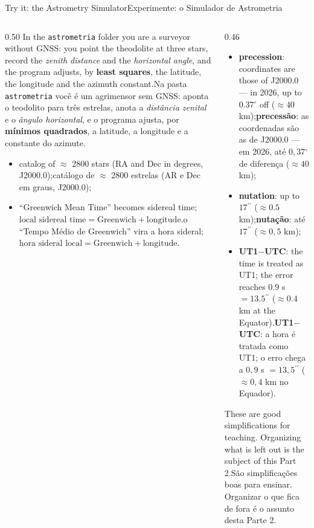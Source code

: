 \documentclass[aspectratio=169,11pt]{beamer}
\newcommand{\tr}[2]{\ifEN#2\else#1\fi}
\newcommand{\bnum}[1]{\textbf{\textcolor{mTeal}{#1}}}
\newcommand{\asec}{\ensuremath{{}^{\prime\prime}}}
\newcommand{\gr}{\ensuremath{{}^{\circ}}}
\begin{document}
\begin{frame}{\tr{Experimente: o Simulador de Astrometria}{Try it: the Astrometry Simulator}}
  \begin{columns}[T]
    \begin{column}{0.50\textwidth}
      \small
      \tr{Na pasta \texttt{astrometria} você é um agrimensor sem GNSS: aponta o teodolito para
      três estrelas, anota a \emph{distância zenital} e o \emph{ângulo horizontal}, e o
      programa ajusta, por \bnum{mínimos quadrados}, a latitude, a longitude e a constante do
      azimute.}{In the \texttt{astrometria} folder you are a surveyor without GNSS: you point
      the theodolite at three stars, record the \emph{zenith distance} and the
      \emph{horizontal angle}, and the program adjusts, by \bnum{least squares}, the latitude,
      the longitude and the azimuth constant.}
      \medskip
      \begin{itemize}
        \setlength{\itemsep}{2pt}
        \item \tr{catálogo de $\approx$ \num{2800} estrelas (AR e Dec em graus, J2000.0);}{catalog of $\approx$ \num{2800} stars (RA and Dec in degrees, J2000.0);}
        \item \tr{o ``Tempo Médio de Greenwich'' vira a hora sideral; $\text{hora sideral local} = \text{Greenwich} + \text{longitude}$.}{``Greenwich Mean Time'' becomes sidereal time; $\text{local sidereal time} = \text{Greenwich} + \text{longitude}$.}
      \end{itemize}
    \end{column}
    \begin{column}{0.46\textwidth}
      \begin{cuidado}[title={\tr{O que o simulador deixa de fora}{What the simulator leaves out}}]
        \footnotesize
        \begin{itemize}
          \setlength{\itemsep}{2pt}
          \item \tr{\textbf{precessão}: as coordenadas são as de J2000.0 --- em 2026, até $0{,}37\gr$ de diferença ($\approx 40$ km);}{\textbf{precession}: coordinates are those of J2000.0 --- in 2026, up to $0.37\gr$ off ($\approx 40$ km);}
          \item \tr{\textbf{nutação}: até $17\asec$ ($\approx 0{,}5$ km);}{\textbf{nutation}: up to $17\asec$ ($\approx 0.5$ km);}
          \item \tr{\textbf{UT1$-$UTC}: a hora é tratada como UT1; o erro chega a $0{,}9$ s $= 13{,}5\asec$ ($\approx 0{,}4$ km no Equador).}{\textbf{UT1$-$UTC}: the time is treated as UT1; the error reaches $0.9$ s $= 13.5\asec$ ($\approx 0.4$ km at the Equator).}
        \end{itemize}
      \end{cuidado}
      \medskip
      {\small\tr{São simplificações boas para ensinar. Organizar o que fica de fora é o assunto
      desta Parte 2.}{These are good simplifications for teaching. Organizing what is left out
      is the subject of this Part 2.}}
    \end{column}
  \end{columns}
\end{frame}
\end{document}
